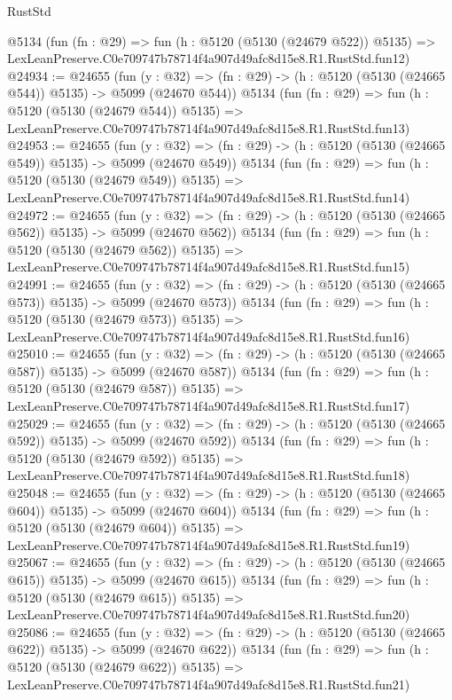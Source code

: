 \begin{lexlean}{RustStd}
\begin{coremodule}
    @5134
    (fun (fn : @29) =>
    fun (h : @5120 (@5130 (@24679 @522)) @5135) =>
    LexLeanPreserve.C0e709747b78714f4a907d49afc8d15e8.R1.RustStd.fun12)
@24934 := @24655
    (fun (y : @32) => (fn : @29) -> (h : @5120 (@5130 (@24665 @544)) @5135) -> @5099 (@24670 @544))
    @5134
    (fun (fn : @29) =>
    fun (h : @5120 (@5130 (@24679 @544)) @5135) =>
    LexLeanPreserve.C0e709747b78714f4a907d49afc8d15e8.R1.RustStd.fun13)
@24953 := @24655
    (fun (y : @32) => (fn : @29) -> (h : @5120 (@5130 (@24665 @549)) @5135) -> @5099 (@24670 @549))
    @5134
    (fun (fn : @29) =>
    fun (h : @5120 (@5130 (@24679 @549)) @5135) =>
    LexLeanPreserve.C0e709747b78714f4a907d49afc8d15e8.R1.RustStd.fun14)
@24972 := @24655
    (fun (y : @32) => (fn : @29) -> (h : @5120 (@5130 (@24665 @562)) @5135) -> @5099 (@24670 @562))
    @5134
    (fun (fn : @29) =>
    fun (h : @5120 (@5130 (@24679 @562)) @5135) =>
    LexLeanPreserve.C0e709747b78714f4a907d49afc8d15e8.R1.RustStd.fun15)
@24991 := @24655
    (fun (y : @32) => (fn : @29) -> (h : @5120 (@5130 (@24665 @573)) @5135) -> @5099 (@24670 @573))
    @5134
    (fun (fn : @29) =>
    fun (h : @5120 (@5130 (@24679 @573)) @5135) =>
    LexLeanPreserve.C0e709747b78714f4a907d49afc8d15e8.R1.RustStd.fun16)
@25010 := @24655
    (fun (y : @32) => (fn : @29) -> (h : @5120 (@5130 (@24665 @587)) @5135) -> @5099 (@24670 @587))
    @5134
    (fun (fn : @29) =>
    fun (h : @5120 (@5130 (@24679 @587)) @5135) =>
    LexLeanPreserve.C0e709747b78714f4a907d49afc8d15e8.R1.RustStd.fun17)
@25029 := @24655
    (fun (y : @32) => (fn : @29) -> (h : @5120 (@5130 (@24665 @592)) @5135) -> @5099 (@24670 @592))
    @5134
    (fun (fn : @29) =>
    fun (h : @5120 (@5130 (@24679 @592)) @5135) =>
    LexLeanPreserve.C0e709747b78714f4a907d49afc8d15e8.R1.RustStd.fun18)
@25048 := @24655
    (fun (y : @32) => (fn : @29) -> (h : @5120 (@5130 (@24665 @604)) @5135) -> @5099 (@24670 @604))
    @5134
    (fun (fn : @29) =>
    fun (h : @5120 (@5130 (@24679 @604)) @5135) =>
    LexLeanPreserve.C0e709747b78714f4a907d49afc8d15e8.R1.RustStd.fun19)
@25067 := @24655
    (fun (y : @32) => (fn : @29) -> (h : @5120 (@5130 (@24665 @615)) @5135) -> @5099 (@24670 @615))
    @5134
    (fun (fn : @29) =>
    fun (h : @5120 (@5130 (@24679 @615)) @5135) =>
    LexLeanPreserve.C0e709747b78714f4a907d49afc8d15e8.R1.RustStd.fun20)
@25086 := @24655
    (fun (y : @32) => (fn : @29) -> (h : @5120 (@5130 (@24665 @622)) @5135) -> @5099 (@24670 @622))
    @5134
    (fun (fn : @29) =>
    fun (h : @5120 (@5130 (@24679 @622)) @5135) =>
    LexLeanPreserve.C0e709747b78714f4a907d49afc8d15e8.R1.RustStd.fun21)

\end{coremodule}
\end{lexlean}
